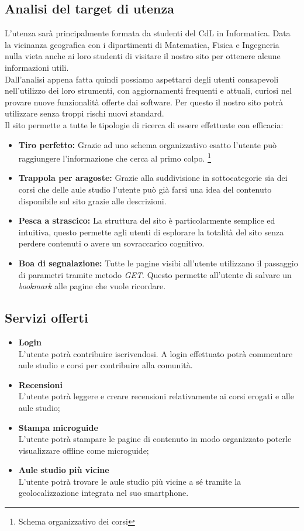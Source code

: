 \subsection{Analisi del target di utenza}\label{analisi_utenza}

L'utenza sarà principalmente formata da studenti del CdL in Informatica. Data la vicinanza geografica con i dipartimenti di Matematica, Fisica e Ingegneria nulla vieta anche ai loro studenti di visitare il nostro sito per ottenere alcune informazioni utili.\\
Dall'analisi appena fatta quindi possiamo aspettarci degli utenti consapevoli nell'utilizzo dei loro strumenti, con aggiornamenti frequenti e attuali, curiosi nel provare nuove funzionalità offerte dai software. Per questo il nostro sito potrà utilizzare senza troppi rischi nuovi standard.\\
Il sito permette a tutte le tipologie di ricerca di essere effettuate con
efficacia:
\begin{itemize}
    \item \textbf{Tiro perfetto:} Grazie ad uno schema organizzativo esatto l'utente può raggiungere l'informazione che cerca al primo colpo. \footnote{Schema organizzativo dei corsi}
    \item \textbf{Trappola per aragoste:} Grazie alla suddivisione in sottocategorie sia dei corsi che delle aule studio l'utente può già farsi una idea del contenuto disponibile sul sito grazie alle descrizioni.
    \item \textbf{Pesca a strascico:} La struttura del sito è particolarmente semplice ed intuitiva, questo permette agli utenti di esplorare la totalità del sito senza perdere contenuti o avere un sovraccarico cognitivo.
    \item \textbf{Boa di segnalazione:} Tutte le pagine visibi all'utente utilizzano il passaggio di parametri tramite metodo \textit{GET}. Questo permette all'utente di salvare un \textit{bookmark} alle pagine che vuole ricordare.
\end{itemize}

\subsection{Servizi offerti}
\begin{itemize}
    \item \textbf{Login} \\ L'utente potrà contribuire iscrivendosi. A login effettuato potrà commentare aule studio e corsi per contribuire alla comunità.
    \item \textbf{Recensioni} \\ L'utente potrà leggere e creare recensioni relativamente ai corsi erogati e alle aule studio;
    \item \textbf{Stampa microguide} \\ L'utente potrà stampare le pagine di contenuto in modo organizzato poterle visualizzare offline come microguide;
    \item \textbf{Aule studio più vicine} \\ L'utente potrà trovare le aule studio più vicine a sé tramite la geolocalizzazione integrata nel suo smartphone.
\end{itemize}
